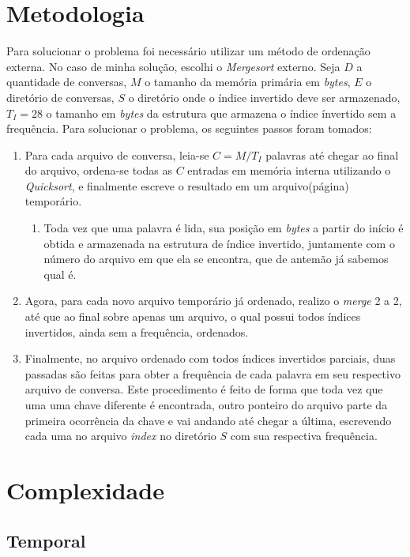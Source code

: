 \documentclass[
	12pt,
	a4paper,
	onepage,
	brazil
]{article}
\begin{document}
	\section{Metodologia}
	
	Para solucionar o problema foi necessário utilizar um método de ordenação externa. No caso de minha solução, escolhi o \textit{Mergesort} externo. Seja $D$ a quantidade de conversas, $M$ o tamanho da memória primária em \textit{bytes}, $E$ o diretório de conversas, $S$ o diretório onde o índice invertido deve ser armazenado, $T_I = 28$ o tamanho em \textit{bytes} da estrutura que armazena o índice ínvertido sem a frequência. Para solucionar o problema, os seguintes passos foram tomados:
	
	\begin{enumerate}
		\item Para cada arquivo de conversa, leia-se $C=M/T_I$ palavras até chegar ao final do arquivo, ordena-se todas as $C$ entradas em memória interna utilizando o \textit{Quicksort}, e finalmente escreve o resultado em um arquivo(página) temporário.
		\begin{enumerate}
			\item Toda vez que uma palavra é lida, sua posição em \textit{bytes} a partir do início é obtida e armazenada na estrutura de índice invertido, juntamente com o número do arquivo em que ela se encontra, que de antemão já sabemos qual é.
		\end{enumerate}
		\item Agora, para cada novo arquivo temporário já ordenado, realizo o \textit{merge} 2 a 2, até que ao final sobre apenas um arquivo, o qual possui todos índices invertidos, ainda sem a frequência, ordenados.
		\item Finalmente, no arquivo ordenado com todos índices invertidos parciais, duas passadas são feitas para obter a frequência de cada palavra em seu respectivo arquivo de conversa. Este procedimento é feito de forma que toda vez que uma uma chave diferente é encontrada, outro ponteiro do arquivo parte da primeira ocorrência da chave e vai andando até chegar a última, escrevendo cada uma no arquivo \textit{index} no diretório $S$ com sua respectiva frequência.
	\end{enumerate}
	
	\section{Complexidade}
	
	\subsection{Temporal}
	
\end{document}
